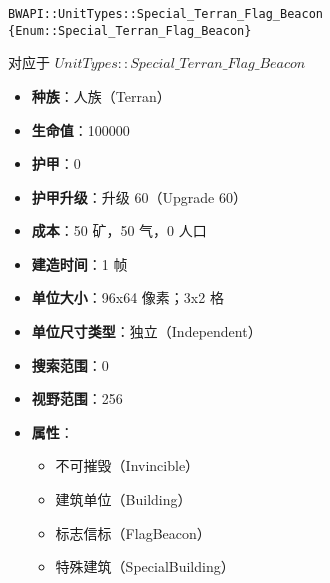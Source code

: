 \begin{tcolorbox}[colback=white, colframe=black!60!white, title=Special\_Terran\_Flag\_Beacon(), arc=0mm]
    \begin{verbatim}
BWAPI::UnitTypes::Special_Terran_Flag_Beacon {Enum::Special_Terran_Flag_Beacon}
    \end{verbatim}
    对应于  $UnitTypes::Special\_Terran\_Flag\_Beacon$ 
    \begin{itemize}
        \item \textbf{种族}：人族（Terran）
        \item \textbf{生命值}：100000
        \item \textbf{护甲}：0
        \item \textbf{护甲升级}：升级 60（Upgrade 60）
        \item \textbf{成本}：50 矿，50 气，0 人口
        \item \textbf{建造时间}：1 帧
        \item \textbf{单位大小}：96x64 像素；3x2 格
        \item \textbf{单位尺寸类型}：独立（Independent）
        \item \textbf{搜索范围}：0
        \item \textbf{视野范围}：256
        \item \textbf{属性}：
            \begin{itemize}
                \item 不可摧毁（Invincible）
                \item 建筑单位（Building）
                \item 标志信标（FlagBeacon）
                \item 特殊建筑（SpecialBuilding）
            \end{itemize}
    \end{itemize}
\end{tcolorbox}

